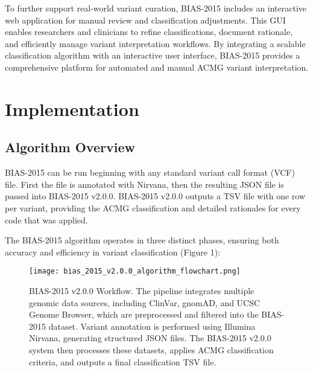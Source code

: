 \documentclass[unnumsec,webpdf,contemporary,large]{oup-authoring-template}
\theoremstyle{thmstyleone}
\theoremstyle{thmstyletwo}
\theoremstyle{thmstylethree}
\begin{document}
To further support real-world variant curation, BIAS-2015 includes an interactive web application for manual review and classification adjustments. This GUI enables researchers and clinicians to refine classifications, document rationale, and efficiently manage variant interpretation workflows. By integrating a scalable classification algorithm with an interactive user interface, BIAS-2015 provides a comprehensive platform for automated and manual ACMG variant interpretation.
\section{Implementation}
\subsection{Algorithm Overview}
BIAS-2015 can be run beginning with any standard variant call format (VCF) file. First the file is annotated with Nirvana, then the resulting JSON file is passed into BIAS-2015 v2.0.0. BIAS-2015 v2.0.0 outputs a TSV file with one row per variant, providing the ACMG classification and detailed rationales for every code that was applied.

The BIAS-2015 algorithm operates in three distinct phases, ensuring both accuracy and efficiency in variant classification (Figure 1):

\begin{figure}[!t]%
\centering
\texttt{[image: bias\_2015\_v2.0.0\_algorithm\_flowchart.png]}
\caption{BIAS-2015 v2.0.0 Workflow. The pipeline integrates multiple genomic data sources, including ClinVar, gnomAD, and UCSC Genome Browser, which are preprocessed and filtered into the BIAS-2015 dataset. Variant annotation is performed using Illumina Nirvana, generating structured JSON files. The BIAS-2015 v2.0.0 system then processes these datasets, applies ACMG classification criteria, and outputs a final classification TSV file.}
\label{fig:bias_flowchart}
\end{figure}
\end{document}

